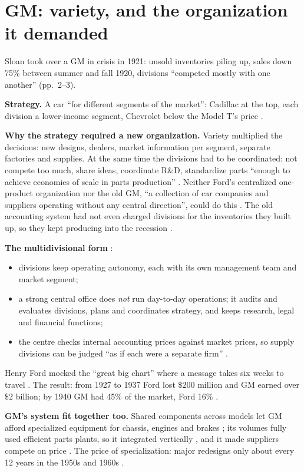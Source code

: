 \section{GM: variety, and the organization it demanded}\label{sec:a1-gm}

Sloan took over a GM in crisis in 1921: unsold inventories piling up, sales down 75\% between
summer and fall 1920, divisions ``competed mostly with one another'' (pp.~2--3).

\textbf{Strategy.} A car ``for different segments of the market'': Cadillac at the top, each
division a lower-income segment, Chevrolet below the Model T's price .

\textbf{Why the strategy required a new organization.} Variety multiplied the decisions: new
designs, dealers, market information per segment, separate factories and supplies. At the same time
the divisions had to be coordinated: not compete too much, share ideas, coordinate R\&D,
standardize parts ``enough to achieve economies of scale in parts production'' . Neither
Ford's centralized one-product organization nor the old GM, ``a collection of car companies and
suppliers operating without any central direction'', could do this . The old accounting
system had not even charged divisions for the inventories they built up, so they kept producing
into the recession .

\textbf{The multidivisional form} :
\begin{itemize}
  \item divisions keep operating autonomy, each with its own management team and market segment;
  \item a strong central office does \emph{not} run day-to-day operations; it audits and evaluates
    divisions, plans and coordinates strategy, and keeps research, legal and financial functions;
  \item the centre checks internal accounting prices against market prices, so supply divisions
    can be judged ``as if each were a separate firm'' .
\end{itemize}

Henry Ford mocked the ``great big chart'' where a message takes six weeks to travel . The
result: from 1927 to 1937 Ford lost $\$200$ million and GM earned over $\$2$ billion; by 1940 GM
had 45\% of the market, Ford 16\% .

\textbf{GM's system fit together too.} Shared components across models let GM afford specialized
equipment for chassis, engines and brakes ; its volumes fully used efficient parts plants, so
it integrated vertically , and it made suppliers compete on price . The price of
specialization: major redesigns only about every 12 years in the 1950s and 1960s .

